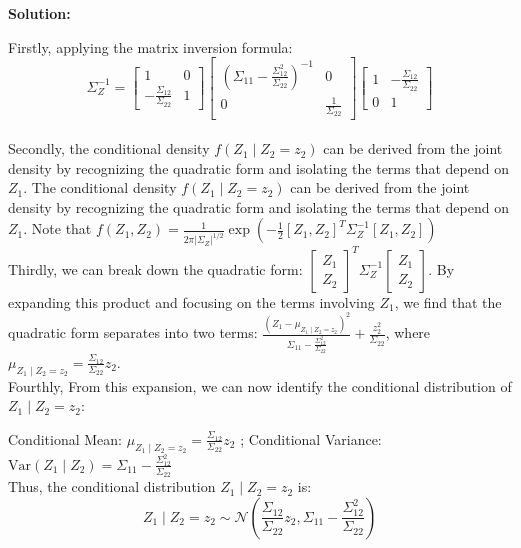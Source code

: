 \documentclass{article}
\newenvironment{solution}{\color{blue} \smallskip \textbf{Solution:}}{}
\begin{document}
\begin{enumerate}[(a)]
    \begin{solution}
    
Firstly, applying the matrix inversion formula:
\[
\Sigma_Z^{-1} = \begin{bmatrix} 1 & 0 \\ -\frac{\Sigma_{12}}{\Sigma_{22}} & 1 \end{bmatrix}
\begin{bmatrix} \left( \Sigma_{11} - \frac{\Sigma_{12}^2}{\Sigma_{22}} \right)^{-1} & 0 \\ 0 & \frac{1}{\Sigma_{22}} \end{bmatrix}
\begin{bmatrix} 1 & -\frac{\Sigma_{12}}{\Sigma_{22}} \\ 0 & 1 \end{bmatrix}
\]\\

Secondly, the conditional density \( f(Z_1 \mid Z_2 = z_2) \) can be derived from the joint density by recognizing the quadratic form and isolating the terms that depend on \( Z_1 \). The conditional density \( f(Z_1 \mid Z_2 = z_2) \) can be derived from the joint density by recognizing the quadratic form and isolating the terms that depend on \( Z_1 \). Note that $f(Z_1, Z_2) = \frac{1}{2\pi |\Sigma_Z|^{1/2}} \exp\left( -\frac{1}{2} [Z_1, Z_2]^T \Sigma_Z^{-1} [Z_1, Z_2] \right)$\\

Thirdly, we can break down the quadratic form: \(\begin{bmatrix} Z_1 \\ Z_2 \end{bmatrix}^T \Sigma_Z^{-1} \begin{bmatrix} Z_1 \\ Z_2 \end{bmatrix}\). By expanding this product and focusing on the terms involving \( Z_1 \), we find that the quadratic form separates into two terms: \(\frac{(Z_1 - \mu_{Z_1 \mid Z_2 = z_2})^2}{\Sigma_{11} - \frac{\Sigma_{12}^2}{\Sigma_{22}}} + \frac{z_2^2}{\Sigma_{22}}\), where \( \mu_{Z_1 \mid Z_2 = z_2} = \frac{\Sigma_{12}}{\Sigma_{22}} z_2 \).\\


Fourthly, From this expansion, we can now identify the conditional distribution of \( Z_1 \mid Z_2 = z_2 \):

Conditional Mean: \( \mu_{Z_1 \mid Z_2 = z_2} = \frac{\Sigma_{12}}{\Sigma_{22}} z_2 \) ;
Conditional Variance: \( \text{Var}(Z_1 \mid Z_2) = \Sigma_{11} - \frac{\Sigma_{12}^2}{\Sigma_{22}} \)\\

Thus, the conditional distribution \( Z_1 \mid Z_2 = z_2 \) is:
\[
Z_1 \mid Z_2 = z_2 \sim \mathcal{N} \left( \frac{\Sigma_{12}}{\Sigma_{22}} z_2, \Sigma_{11} - \frac{\Sigma_{12}^2}{\Sigma_{22}} \right)
\]



    \end{solution}
\end{enumerate}
\end{document}
